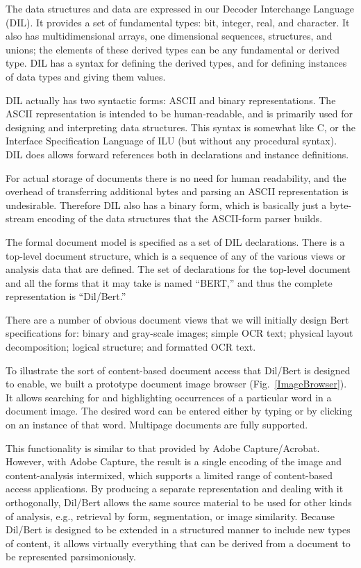 The data structures and data are expressed in our Decoder Interchange
Language (DIL).  It provides a set of fundamental types: bit, integer,
real, and character.  It also has multidimensional arrays, one
dimensional sequences, structures, and unions; the elements of these
derived types can be any fundamental or derived type.  DIL has a
syntax for defining the derived types, and for defining instances of
data types and giving them values.

DIL actually has two syntactic forms: ASCII and binary representations.
The ASCII representation is intended to be human-readable, and is
primarily used for designing and interpreting data structures.  This
syntax is somewhat like C, or the Interface Specification Language of
ILU\cite{ilu} (but without any procedural syntax).  DIL does allows
forward references both in declarations and instance definitions.

For actual storage of documents there is no need for human readability,
and the overhead of transferring additional bytes and parsing an ASCII
representation is undesirable.  Therefore DIL also has a binary form,
which is basically just a byte-stream encoding of the data structures
that the ASCII-form parser builds.

The formal document model is specified as a set of DIL declarations.
There is a top-level document structure, which is a sequence of any of
the various views or analysis data that are defined.  The set of
declarations for the top-level document and all the forms that it may
take is named ``BERT,'' and thus the
complete representation is ``Dil/Bert.''

There are a number of obvious document views that we will initially
design Bert specifications for:
binary and gray-scale images; simple OCR text; physical layout
decomposition; logical structure; and formatted OCR text.

To illustrate the sort of content-based document access that Dil/Bert is
designed to enable, we built a prototype document image browser (Fig.\
\ref{ImageBrowser}).  It allows searching for and highlighting
occurrences of a particular word in a document image.  The desired word
can be entered either by typing or by clicking on an instance of that
word.  Multipage documents are fully supported.

This functionality is similar to that provided by
Adobe Capture/Acrobat. However, with Adobe Capture, the result is a
single encoding of the image and content-analysis intermixed, which
supports a limited range of content-based access applications.
By producing a separate representation and dealing with it
orthogonally, Dil/Bert allows the same source material to be used for
other kinds of analysis, e.g., retrieval by form, segmentation, or
image similarity.
Because Dil/Bert is designed to be
extended in a structured manner to include new types of content,
it allows virtually everything that can be derived from a document to be
represented parsimoniously.

